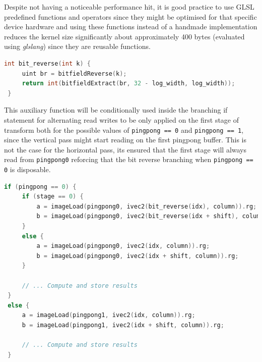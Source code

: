 \documentclass[
  oneside,
  11pt, a4paper,
  footinclude=true,
  headinclude=true,
  cleardoublepage=empty
]{scrbook}
\begin{document}
Despite not having a noticeable performance hit, it is good practice to use GLSL predefined functions and operators since they might be optimised for that specific device hardware and using these functions instead of a handmade implementation reduces the kernel size significantly about approximately 400 bytes (evaluated using \textit{glslang}) since they are reusable functions. 

\begin{lstlisting}[language=C,label={Auxiliary function that take advantage of GLSL's predefined utilities}]
 int bit_reverse(int k) {
     uint br = bitfieldReverse(k);
     return int(bitfieldExtract(br, 32 - log_width, log_width));
 }
\end{lstlisting}

This auxiliary function will be conditionally used inside the branching if statement for alternating read writes to be only applied on the first stage of transform both for the possible values of \texttt{pingpong == 0} and \texttt{pingpong == 1}, since the vertical pass might start reading on the first pingpong buffer. This is not the case for the horizontal pass, its ensured that the first stage will always read from \texttt{pingpong0} reforcing that the bit reverse branching when \texttt{pingpong == 0} is disposable.

\begin{lstlisting}[language=C,label={Computation of the Cooley-Tukey butterfly with bit reversal}]
 if (pingpong == 0) {
     if (stage == 0) {
         a = imageLoad(pingpong0, ivec2(bit_reverse(idx), column)).rg;
         b = imageLoad(pingpong0, ivec2(bit_reverse(idx + shift), column)).rg;
     }
     else {
         a = imageLoad(pingpong0, ivec2(idx, column)).rg;
         b = imageLoad(pingpong0, ivec2(idx + shift, column)).rg;
     }

     // ... Compute and store results
 }
 else {
     a = imageLoad(pingpong1, ivec2(idx, column)).rg;
     b = imageLoad(pingpong1, ivec2(idx + shift, column)).rg;

     // ... Compute and store results
 }
\end{lstlisting}


\end{document}
